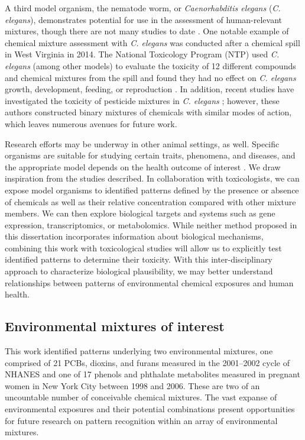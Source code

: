 A third model organism, the nematode worm, or \textit{Caenorhabditis elegans} (\textit{C. elegans}), demonstrates potential for use in the assessment of human-relevant mixtures, though there are not many studies to date \cite{hunt2017c}. One notable example of chemical mixture assessment with \textit{C. elegans} was conducted after a chemical spill in West Virginia in 2014. The National Toxicology Program (NTP) used \textit{C. elegans} (among other models) to evaluate the toxicity of 12 different compounds and chemical mixtures from the spill and found they had no effect on \textit{C. elegans} growth, development, feeding, or reproduction \cite{ntp_worms}. In addition, recent studies have investigated the toxicity of pesticide mixtures in \textit{C. elegans} \cite{wang2021assessing,huang2021combined}; however, these authors constructed binary mixtures of chemicals with similar modes of action, which leaves numerous avenues for future work.
 
Research efforts may be underway in other animal settings, as well. Specific organisms are suitable for studying certain traits, phenomena, and diseases, and the appropriate model depends on the health outcome of interest \cite{katz2016model}. We draw inspiration from the studies described. In collaboration with toxicologists, we can expose model organisms to identified patterns defined by the presence or absence of chemicals as well as their relative concentration compared with other mixture members. We can then explore biological targets and systems such as gene expression, transcriptomics, or metabolomics. While neither method proposed in this dissertation incorporates information about biological mechanisms, combining this work with toxicological studies will allow us to explicitly test identified patterns to determine their toxicity. With this inter-disciplinary approach to characterize biological plausibility, we may better understand relationships between patterns of environmental chemical exposures and human health.

\subsection{Environmental mixtures of interest}
This work identified patterns underlying two environmental mixtures, one comprised of 21 PCBs, dioxins, and furans measured in the 2001--2002 cycle of NHANES and one of 17 phenols and phthalate metabolites measured in pregnant women in New York City between 1998 and 2006. These are two of an uncountable number of conceivable chemical mixtures. The vast expanse of environmental exposures and their potential combinations present opportunities for future research on pattern recognition within an array of environmental mixtures. 

